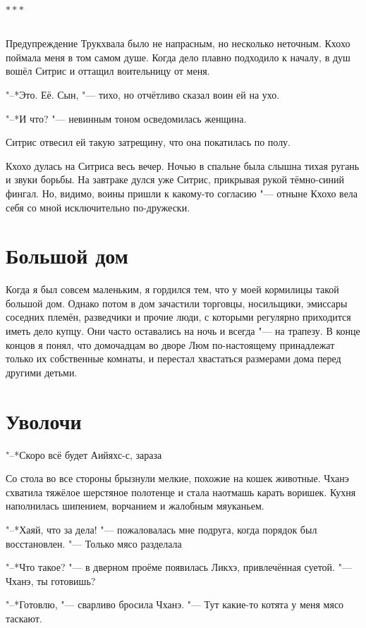 \documentclass[a4paper,10pt]{book}
\newcommand{\ldotst}{\so{...}\xspace}
\newcommand{\ldotse}{\so{!..}\xspace}
\newcommand{\razd}{~\\{\centering\Large\bfseries$\ast \ast \ast$\par}~\\}
\begin{document}
\razd

Предупреждение Трукхвала было не напрасным, но несколько неточным. Кхохо 
поймала меня в том самом душе. Когда дело плавно подходило к началу, в душ 
вошёл Ситрис и оттащил воительницу от меня.

"--*Это. Её. Сын, "--- тихо, но отчётливо сказал воин ей на ухо.

"--*И что? "--- невинным тоном осведомилась женщина.

Ситрис отвесил ей такую затрещину, что она покатилась по полу.

Кхохо дулась на Ситриса весь вечер. Ночью в спальне была слышна тихая ругань и 
звуки борьбы. На завтраке дулся уже Ситрис, прикрывая рукой тёмно-синий фингал. 
Но, видимо, воины пришли к какому-то согласию "--- отныне Кхохо вела себя со 
мной исключительно по-дружески.
 
\section{Большой дом}
 
Когда я был совсем маленьким, я гордился тем, что у моей кормилицы такой 
большой 
дом. Однако потом в дом зачастили торговцы, носильщики, эмиссары соседних 
племён, разведчики и прочие люди, с которыми регулярно приходится иметь дело 
купцу. Они часто оставались на ночь и всегда "--- на трапезу. В конце концов я 
понял, что домочадцам во дворе Люм по-настоящему принадлежат только их 
собственные комнаты, и перестал хвастаться размерами дома перед другими детьми.
 
 
\section{Уволочи}
 
"--*Скоро всё будет\ldotst Аийяхс-с, зараза\ldotse

Со стола во все стороны брызнули мелкие, похожие на кошек животные. Чханэ 
схватила тяжёлое шерстяное полотенце и стала наотмашь карать воришек. Кухня 
наполнилась шипением, ворчанием и жалобным мяуканьем.

"--*Хаяй, что за дела! "--- пожаловалась мне подруга, когда порядок был 
восстановлен. "--- Только мясо разделала\ldotse

"--*Что такое? "--- в дверном проёме появилась Ликхэ, привлечённая суетой. "--- 
Чханэ, ты готовишь?

"--*Готовлю, "--- сварливо бросила Чханэ. "--- Тут какие-то котята у меня мясо 
таскают.
\end{document}
